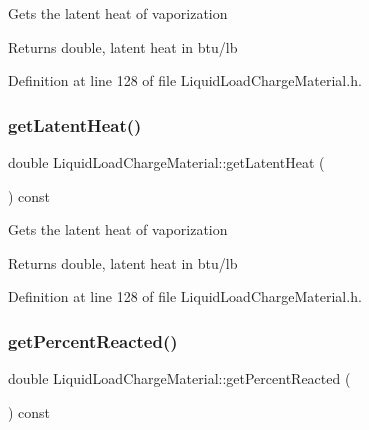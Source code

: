 Gets the latent heat of vaporization \begin{DoxyReturn}{Returns}
double, latent heat in btu/lb 
\end{DoxyReturn}


Definition at line 128 of file Liquid\+Load\+Charge\+Material.\+h.

\mbox{\label{class_liquid_load_charge_material_aca3a38eb3343144042e9349b053da1bc}} 
\subsubsection{\texorpdfstring{get\+Latent\+Heat()}{getLatentHeat()}\hspace{0.1cm}{\footnotesize\ttfamily [3/3]}}
{\footnotesize\ttfamily double Liquid\+Load\+Charge\+Material\+::get\+Latent\+Heat (\begin{DoxyParamCaption}{ }\end{DoxyParamCaption}) const\hspace{0.3cm}{\ttfamily [inline]}}

Gets the latent heat of vaporization \begin{DoxyReturn}{Returns}
double, latent heat in btu/lb 
\end{DoxyReturn}


Definition at line 128 of file Liquid\+Load\+Charge\+Material.\+h.

\mbox{\label{class_liquid_load_charge_material_acfedb26800cbead9bf11c57e1356dd57}} 
\subsubsection{\texorpdfstring{get\+Percent\+Reacted()}{getPercentReacted()}\hspace{0.1cm}{\footnotesize\ttfamily [1/3]}}
{\footnotesize\ttfamily double Liquid\+Load\+Charge\+Material\+::get\+Percent\+Reacted (\begin{DoxyParamCaption}{ }\end{DoxyParamCaption}) const\hspace{0.3cm}{\ttfamily [inline]}}

